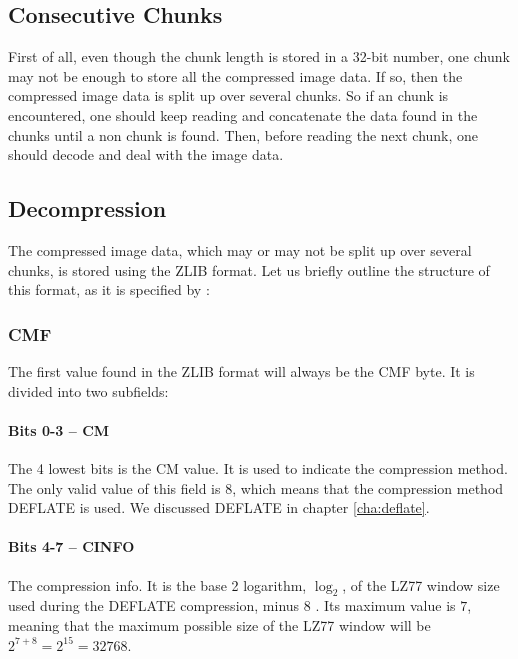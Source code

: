 \subsection{Consecutive Chunks}

First of all, even though the chunk length is stored in a 32-bit
number, one chunk may not be enough to store all the compressed image
data. If so, then the compressed image data is split up over several
\IDAT chunks. So if an \IDAT chunk is encountered, one should keep
reading and concatenate the data found in the \IDAT chunks until a non
\IDAT chunk is found. Then, before reading the next chunk, one should
decode and deal with the image data.

\subsection{Decompression}
\label{sec:png-dec}

The compressed image data, which may or may not be split up over
several \IDAT chunks, is stored using the ZLIB format. Let us briefly
outline the structure of this format, as it is specified by
\cite{gailly96:_zlib_compr_data_format_specif}:

\subsubsection{CMF}

The first value found in the ZLIB format will always be the CMF
byte. It is divided into two subfields:

\paragraph{Bits 0-3 -- CM}

The 4 lowest bits is the CM value. It is used to indicate the
compression method. The only valid value of this field is $8$, which
means that the compression method DEFLATE is used. We discussed
DEFLATE in chapter \ref{cha:deflate}.

\paragraph{Bits 4-7 -- CINFO}

The compression info. It is the base 2 logarithm, $\log_2$, of the
LZ77 window size used during the DEFLATE compression, minus $8$ . Its
maximum value is $7$, meaning that the maximum possible size of the LZ77 window
will be $2^{7 + 8} = 2^{15} = 32768$.

